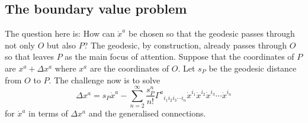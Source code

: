\documentclass[a4paper,12pt]{article}
\numberwithin{equation}{section}
\begin{document}
\subsection{The boundary value problem}\label{sub:CoordsBVP}

The question here is: How can ${\Dot x}^a$ be chosen so that the geodesic passes through not
only $O$ but also $P$? The geodesic, by construction, already passes through $O$
so that leaves $P$ as the main focus of attention. Suppose that the coordinates of $P$ are
$x^a + \Delta x^a$ where $x^a$ are the coordinates of $O$. Let $s_P$ be the geodesic
distance from $O$ to $P$. The challenge now is to solve
\[
\Delta x^a = s_P {\Dot x}^a
           - \sum_{n=2}^\infty \frac{s_P^n}{n!}\Gamma^{a}{}_{i_1i_2i_3\cdots i_n}
                                               {\Dot x}^{i_1}
                                               {\Dot x}^{i_2}
                                               {\Dot x}^{i_3}\cdots
                                               {\Dot x}^{i_n}
\]
for ${\Dot x}^a$ in terms of $\Delta x^a$ and the generalised connections.
\end{document}
